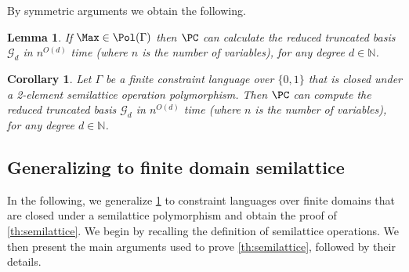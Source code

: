 \documentclass[11pt]{article}
\newtheorem{lemma}[theorem]{Lemma}
\newtheorem{corollary}[theorem]{Corollary}
\begin{document}
By symmetric arguments we obtain the following.
\begin{lemma}\label{th:Max}
If $\Max\in\Pol(\Gamma)$ then $\PC$ can calculate the reduced truncated basis \GB $\mathcal{G}_d$ in $n^{O(d)}$ time (where $n$ is the number of variables), for any degree $d\in \mathbb{N}$.
\end{lemma}
\begin{corollary}\label{th:2semilattice}
    Let $\Gamma$ be a finite constraint language over $\{0, 1\}$ that is closed under  a 2-element semilattice operation polymorphism. Then $\PC$ can compute the reduced truncated \GB basis $\mathcal{G}_d$ in $n^{O(d)}$ time (where $n$ is the number of variables), for any degree $d\in \mathbb{N}$.
\end{corollary}



\subsection{Generalizing to finite domain semilattice}
In the following, we generalize \cref{th:2semilattice} to constraint languages over finite domains that are closed under a semilattice polymorphism and obtain the proof of \cref{th:semilattice}. We begin by recalling the definition of semilattice operations. We then present the main arguments used to prove \cref{th:semilattice}, followed by their details.

\end{document}
